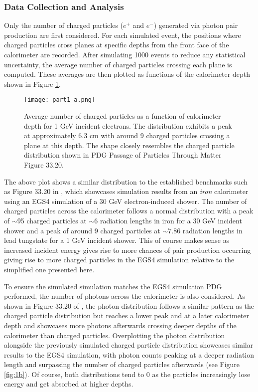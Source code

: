 \documentclass[twocolumn]{aastex631}
\begin{document}
\subsubsection{Data Collection and Analysis} 


Only the number of charged particles ($e^+$ and $e^-$) generated via photon pair
production are first considered. For each simulated event, the positions where
charged particles cross planes at specific depths from the front face of the
calorimeter are recorded. After simulating 1000 events to reduce any statistical
uncertainty, the average number of charged particles crossing each plane is
computed. These averages are then plotted as functions of the calorimeter depth
shown in Figure \ref{fig:1a}. 

 \begin{figure}[htp]
  \centering
    \texttt{[image: part1\_a.png]}
    \caption{ Average number of charged particles as a function of calorimeter
        depth for 1 GeV incident electrons. The distribution exhibits a peak
        at approximately 6.3 cm with around 9 charged particles crossing a plane
        at this depth. The shape closely resembles the charged particle
        distribution shown in PDG Passage of Particles Through Matter Figure
    33.20.}
    \label{fig:1a}
\end{figure}

The above plot shows a similar distribution to the established benchmarks such as Figure 33.20 in
\cite{Groom2019ParticlePassage}, which showcases simulation results 
from an \textit{iron} calorimeter using an EGS4 simulation
\citep{Agostinelli2003} of a 30 GeV electron-induced shower. The number of
charged particles across the calorimeter follows a normal distribution with a
peak of $\sim$95 charged particles at $\sim$6 radiation lengths in iron for a
30 GeV incident shower and a peak of around 9 charged particles at 
$\sim$7.86 radiation lengths in lead tungstate for a 1 GeV incident shower. This
of course makes sense as increased incident energy gives rise to more chances of
pair production occurring giving rise to more charged particles in the EGS4
simulation relative to the simplified one presented here. 

To ensure the simulated simulation matches the EGS4 simulation PDG performed,
the number of photons across the calorimeter is also considered. As shown in
Figure 33.20 of \cite{Groom2019ParticlePassage}, the photon distribution follows
a similar pattern as the charged particle distribution but reaches a lower peak 
and at a later calorimeter depth and showcases more photons afterwards crossing deeper
depths of the calorimeter than charged particles. Overplotting the photon
distribution alongside the previously simulated charged particle distribution
showcases similar results to the EGS4 simulation, with photon counts peaking at 
a deeper radiation length and surpassing the number of charged particles
afterwards (see Figure \ref{fig:1b}). Of course, both distributions tend to 0 as the particles
increasingly lose energy
and get absorbed at higher depths. 
\end{document}
